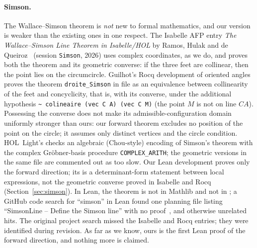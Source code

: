 \documentclass[11pt]{article}
\theoremstyle{definition}
\theoremstyle{remark}
\newcommand{\lean}[1]{\texttt{#1}}
\begin{document}
\paragraph{Simson.} The Wallace--Simson theorem is \emph{not} new to formal mathematics, and our
version is weaker than the existing ones in one respect. The Isabelle AFP entry \emph{The
Wallace--Simson Line Theorem in Isabelle/HOL} by Ramos, Hulak and de Queiroz~\cite{AFPSimson}
(session \lean{Simson}, 2026) uses complex coordinates, as we do, and proves both the theorem and
its geometric converse: if the three feet are collinear, then the point lies on the circumcircle.
Guilhot's Rocq development of oriented angles~\cite{GuilhotAngles,Guilhot} proves the theorem
\lean{droite\_Simson} in file  as an equivalence between collinearity of the
feet and concyclicity, that is, with its converse, under the additional hypothesis
\lean{\textasciitilde{} colineaire (vec C A) (vec C M)} (the point $M$ is not on line $CA$). Possessing
the converse does not make its admissible-configuration domain uniformly stronger than ours: our
forward theorem excludes no position of the point on the circle; it assumes only distinct
vertices and the circle condition. HOL~Light's 
\cite{HOLGrobner} checks an algebraic (Chou-style) encoding of Simson's theorem with the complex
Gr\"obner-basis procedure \lean{COMPLEX\_ARITH}; the geometric versions in the same file are
commented out as too slow. Our Lean development proves only the forward direction; its
 is a determinant-form statement between local
expressions, not the geometric converse proved in Isabelle and Rocq
(Section~\ref{sec:simson}). In Lean, the theorem is not in Mathlib and not in
; a GitHub code search for ``simson'' in Lean found one planning file listing
``SimsonLine -- Define the Simson line'' with no proof~\cite{EGPlan}, and otherwise unrelated hits.
The original project search missed the Isabelle and Rocq entries; they were identified during
revision. As far as we know, ours is the first Lean proof of the forward direction, and nothing
more is claimed.
\end{document}
